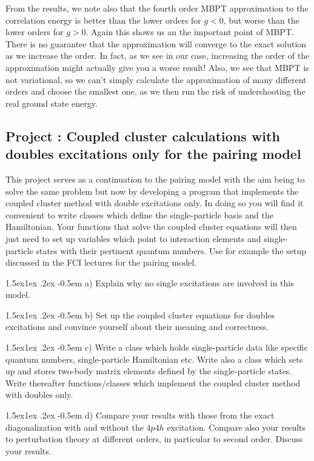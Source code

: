 \documentclass[%
twoside,                 %
final,                   %
10pt]{article}
\makeatletter
\newenvironment{doconceexercise}{}{}
\newcounter{doconceexercisecounter}
\newcommand\subex{\@startsection{paragraph}{4}{\z@}%
                  {1.5ex\@plus1ex \@minus.2ex}%
                  {-0.5em}%
                  {\normalfont\normalsize\bfseries}}
\makeatother
\begin{document}
\begin{doconceexercise}
From the results, we note also that the fourth order MBPT approximation to
the correlation energy is better than the lower orders for $g<0$, but
worse than the lower orders for $g>0$. Again this shows us an the
important point of MBPT. There is no guarantee that the approximation
will converge to the exact solution as we increase the order. In fact,
as we see in our case, increasing the order of the approximation might
actually give you a worse result! Also, we see that MBPT is not
variational, so we can't simply calculate the approximation of many
different orders and choose the smallest one, as we then run the risk
of undershooting the real ground state energy.


\end{doconceexercise}




\begin{doconceexercise}

\subsection*{Project \thedoconceexercisecounter: Coupled cluster calculations with doubles excitations only for the pairing model}


This project serves as a continuation to the pairing model with the aim being to solve the same problem but now by developing
a program that implements the coupled cluster method with double excitations only. In doing so you will find it convenient to write 
classes which define the single-particle basis and the Hamiltonian. Your functions that solve the coupled cluster equations will then just need to set up variables which point to interaction elements and single-particle states with their pertinent quantum numbers. Use for example the setup discussed in the FCI lectures for the pairing model.


\subex{a)}
Explain why no single excitations are involved in this model.

\subex{b)}
Set up the coupled cluster equations for doubles excitations and convince yourself about their meaning and correctness.

\subex{c)}
Write a class which holds single-particle data like specific quantum numbers, single-particle Hamiltonian etc. Write also a class which sets up and stores two-body matrix elements defined by the single-particle states.  Write thereafter functions/classes which implement the coupled cluster method with doubles only.

\subex{d)}
Compare your results with those from the exact diagonalization with and without the $4p4h$ excitation. Compare also your results to perturbation theory at different orders, in particular to second order. Discuss your results.

\end{doconceexercise}
\end{document}
